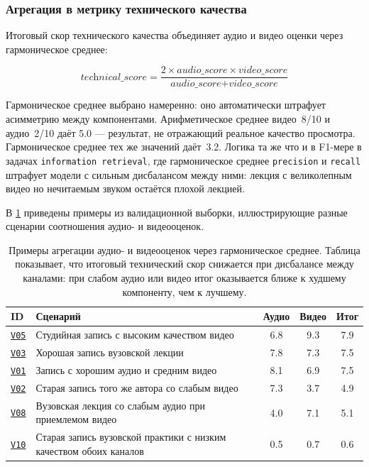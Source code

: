 \subsubsection{Агрегация в метрику технического качества}

Итоговый скор технического качества объединяет аудио и видео оценки
через гармоническое среднее:

\begin{equation}
\textit{technical\_score} =
    \frac{2 \times \textit{audio\_score} \times \textit{video\_score}}
         {\textit{audio\_score} + \textit{video\_score}}
\end{equation}

Гармоническое среднее выбрано намеренно: оно автоматически штрафует
асимметрию между компонентами. Арифметическое среднее видео~8/10
и аудио~2/10 даёт 5.0 — результат, не отражающий реальное качество
просмотра. Гармоническое среднее тех же значений даёт~3.2.
Логика та же что и в F1-мере в задачах \texttt{information retrieval},
где гармоническое среднее \texttt{precision} и \texttt{recall} штрафует модели
с сильным дисбалансом между ними: лекция с великолепным видео
но нечитаемым звуком остаётся плохой лекцией.

В \cref{tab:audio_video_examples} приведены примеры из валидационной выборки,
иллюстрирующие разные сценарии соотношения аудио- и видеооценок.

\begin{table}[h]
\centering
\small
\begin{tabular}{p{} p{} ccc}
\toprule
\textbf{ID} & \textbf{Сценарий} & \textbf{Аудио} & \textbf{Видео} & \textbf{Итог} \\
\midrule
\hyperlink{vid:v05}{\texttt{V05}} &
Студийная запись с высоким качеством видео & 6.8 & 9.3 & 7.9  \\

\hyperlink{vid:v03}{\texttt{V03}} &
Хорошая запись вузовской лекции & 7.8 & 7.3 & 7.5 \\

\hyperlink{vid:v01}{\texttt{V01}} &
Запись с хорошим аудио и средним видео & 8.1 & 6.9 & 7.5  \\

\hyperlink{vid:v02}{\texttt{V02}} &
Старая запись того же автора со слабым видео & 7.3 & 3.7 & 4.9  \\

\hyperlink{vid:v08}{\texttt{V08}} &
Вузовская лекция со слабым аудио при приемлемом видео & 4.0 & 7.1 & 5.1  \\

\hyperlink{vid:v10}{\texttt{V10}} &
Старая запись вузовской практики с низким качеством обоих каналов & 0.5 & 0.7 & 0.6  \\
\bottomrule
\end{tabular}
\caption{Примеры агрегации аудио- и видеооценок через гармоническое среднее.
Таблица показывает, что итоговый технический скор снижается при дисбалансе между каналами:
при слабом аудио или видео итог оказывается ближе к худшему компоненту, чем к лучшему.}
\label{tab:audio_video_examples}
\end{table}


